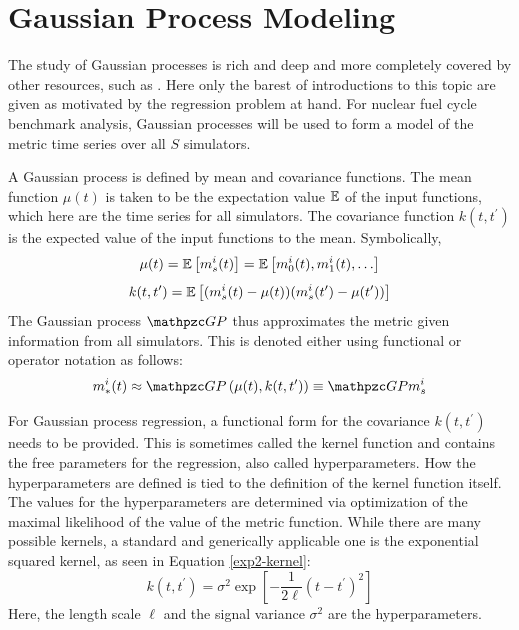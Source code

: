 \section{Gaussian Process Modeling}
\label{gp}
The study of Gaussian processes is rich and deep and more completely covered by 
other resources, such as \cite{rasmussen2006gaussian}. Here only the barest of 
introductions to this topic are given as motivated by the regression problem at
hand. For nuclear fuel cycle benchmark analysis, Gaussian processes will be used
to form a model of the metric time series over all $S$ simulators. 

A Gaussian process is defined by mean and covariance functions. 
The mean function $\mu(t)$ is taken to be the expectation value $\mathbb{E}$ of 
the input functions, which here are the time series for all simulators. The
covariance function $k(t, t^\prime)$ is the expected value of the input 
functions to the mean. Symbolically, 
\begin{equation}
\label{mean-func}
\mu(t) = \mathbb{E}\left[m_s^i(t)\right] = \mathbb{E}\left[m_0^i(t), m_1^i(t), \ldots\right]
\end{equation}
\begin{equation}
\label{covar-func}
k(t, t^\prime) = \mathbb{E}\left[(m_s^i(t) - \mu(t))(m_s^i(t^\prime) - \mu(t^\prime))\right]
\end{equation}
The Gaussian process $\GP$ thus approximates the metric given information from all 
simulators. This is denoted either using functional or operator notation as follows:
\begin{equation}
\label{gp-def-approx}
m_*^i(t) \approx \GP\left(\mu(t), k(t, t^\prime)\right) \equiv \GP m_s^i
\end{equation}

For Gaussian process regression, a functional form for the covariance 
$k(t, t^\prime)$ needs to be provided.
This is sometimes called the kernel function and contains the free parameters 
for the regression, also called hyperparameters. How the hyperparameters are 
defined is 
tied to the definition of the kernel function itself. The values for the 
hyperparameters are determined
via optimization of the maximal likelihood of the value of the metric function.
While there are many possible kernels, a standard and generically applicable one 
is the exponential squared kernel, as seen in Equation \ref{exp2-kernel}:
\begin{equation}
\label{exp2-kernel}
k(t, t^\prime) = \sigma^2 \exp\left[-\frac{1}{2\ell}(t - t^\prime)^2 \right]
\end{equation}
Here, the length scale $\ell$ and the signal variance $\sigma^2$ are the 
hyperparameters.

